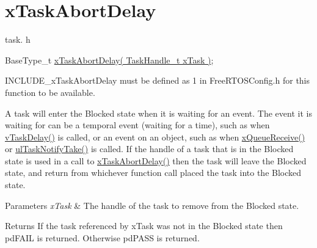 \hypertarget{group__xTaskAbortDelay}{}\section{x\+Task\+Abort\+Delay}
\label{group__xTaskAbortDelay}
task. h 
\begin{DoxyPre}BaseType\_t \hyperlink{task_8h_afefe333df0492c8411c0094badd25185}{xTaskAbortDelay( TaskHandle\_t xTask )};\end{DoxyPre}


I\+N\+C\+L\+U\+D\+E\+\_\+x\+Task\+Abort\+Delay must be defined as 1 in Free\+R\+T\+O\+S\+Config.\+h for this function to be available.

A task will enter the Blocked state when it is waiting for an event. The event it is waiting for can be a temporal event (waiting for a time), such as when \hyperlink{task_8h_aa154068cecd7f31446a7a84af44ab1a3}{v\+Task\+Delay()} is called, or an event on an object, such as when \hyperlink{queue_8h_ae8364d988c6f9b63c771cc2b3dfe5df9}{x\+Queue\+Receive()} or \hyperlink{task_8h_a66540bef602522a01a519f776e4c07d8}{ul\+Task\+Notify\+Take()} is called. If the handle of a task that is in the Blocked state is used in a call to \hyperlink{task_8h_afefe333df0492c8411c0094badd25185}{x\+Task\+Abort\+Delay()} then the task will leave the Blocked state, and return from whichever function call placed the task into the Blocked state.


\begin{DoxyParams}{Parameters}
{\em x\+Task} & The handle of the task to remove from the Blocked state.\\
\hline
\end{DoxyParams}
\begin{DoxyReturn}{Returns}
If the task referenced by x\+Task was not in the Blocked state then pd\+F\+A\+IL is returned. Otherwise pd\+P\+A\+SS is returned. 
\end{DoxyReturn}
